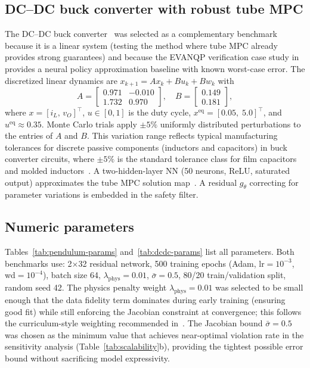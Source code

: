 \documentclass[12pt,a4paper]{article}
\begin{document}
\subsection{DC--DC buck converter with robust tube MPC}
\label{subsec:dcdc-setup}

The DC--DC buck converter~\cite{schwan2023evanqp,nghiem2023piml}
was selected as a complementary benchmark because it is a linear system
(testing the method where tube MPC already provides strong guarantees)
and because the EVANQP verification case study
in~\cite{schwan2023evanqp} provides a neural policy approximation
baseline with known worst-case error. The discretized linear dynamics
are $x_{k+1} = Ax_k + Bu_k + Bw_k$ with
\begin{equation}
  A = \begin{bmatrix} 0.971 & -0.010 \\ 1.732 & 0.970 \end{bmatrix},
  \quad
  B = \begin{bmatrix} 0.149 \\ 0.181 \end{bmatrix},
  \label{eq:dcdc-matrices}
\end{equation}
where $x = [i_L,\,v_O]^\top$, $u \in [0,1]$ is the duty cycle,
$x^{\mathrm{eq}} = [0.05,\;5.0]^\top$, and $u^{\mathrm{eq}} \approx 0.35$.
Monte Carlo trials apply $\pm 5\%$ uniformly distributed perturbations
to the entries of $A$ and $B$. This variation range reflects typical
manufacturing tolerances for discrete passive components (inductors and
capacitors) in buck converter circuits, where $\pm 5\%$ is the standard
tolerance class for film capacitors and molded
inductors~\cite{schwan2023evanqp}. A two-hidden-layer NN (50 neurons,
ReLU, saturated output) approximates the tube MPC solution
map~\cite{schwan2023evanqp}. A residual $g_\theta$ correcting
for parameter variations is embedded in the safety filter.

\subsection{Numeric parameters}
\label{subsec:params}

Tables~\ref{tab:pendulum-params} and~\ref{tab:dcdc-params} list all
parameters. Both benchmarks use: 2$\times$32 residual network, 500
training epochs (Adam, lr$=10^{-3}$, wd$=10^{-4}$), batch size 64,
$\lambda_{\mathrm{phys}} = 0.01$, $\bar\sigma = 0.5$, 80/20
train/validation split, random seed 42. The physics penalty weight
$\lambda_{\mathrm{phys}} = 0.01$ was selected to be small enough that
the data fidelity term dominates during early training (ensuring good
fit) while still enforcing the Jacobian constraint at convergence; this
follows the curriculum-style weighting recommended
in~\cite{nghiem2023piml}. The Jacobian bound $\bar\sigma = 0.5$ was
chosen as the minimum value that achieves near-optimal violation rate in
the sensitivity analysis (Table~\ref{tab:scalability}b), providing the
tightest possible error bound without sacrificing model expressivity.
\end{document}
